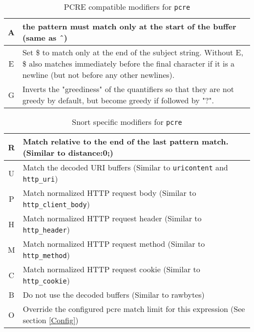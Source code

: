 \documentclass[english]{report}
\begin{document}
\begin{table}[ht]
\begin{center}
\caption{PCRE compatible modifiers for \texttt{pcre}}
\label{pcre-mod_pcre}
\begin{tabular}{|c|p{4.5in}|}

\hline
A &

the pattern must match only at the start of the buffer (same as \^\ ) \\

\hline
E &

Set \$ to match only at the end of the subject string.  Without E, \$ also
matches immediately before the final character if it is a newline (but not
before any other newlines). \\

\hline
G &

Inverts the "greediness" of the quantifiers so that they are not greedy by
default, but become greedy if followed by "?". \\

\hline
\end{tabular}
\end{center}
\end{table}

\begin{table}[ht]
\begin{center}
\caption{Snort specific modifiers for \texttt{pcre}}
\label{pcre-mod_snort}
\begin{tabular}{|c|p{4.5in}|}

\hline
R &
Match relative to the end of the last pattern match.  (Similar to distance:0;) \\

\hline
U &
Match the decoded URI buffers (Similar to \texttt{uricontent} and \texttt{http\_uri}) \\

\hline
P &
Match normalized HTTP request body (Similar to \texttt{http\_client\_body}) \\

\hline
H &
Match normalized HTTP request header (Similar to \texttt{http\_header}) \\

\hline
M &
Match normalized HTTP request method (Similar to \texttt{http\_method}) \\

\hline
C &
Match normalized HTTP request cookie (Similar to \texttt{http\_cookie}) \\

\hline
B &
Do not use the decoded buffers (Similar to rawbytes) \\

\hline
O &
Override the configured pcre match limit for this expression (See section \ref{Config}) \\

\hline
\end{tabular}
\end{center}
\end{table}
\end{document}
